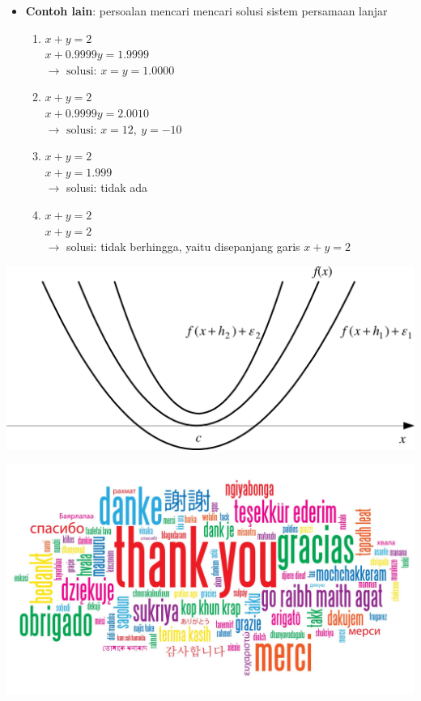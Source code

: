 \documentclass[pdflatex,compress]{beamer}
\begin{document}
\begin{frame}
	\begin{itemize}
		\item \textbf{Contoh lain}: persoalan mencari mencari solusi sistem persamaan lanjar
		\begin{enumerate}
			\item $ x+y=2 $\\
			$ x+0.9999y = 1.9999 $\\
			$ \rightarrow \text{ solusi: } x = y = 1.0000$
			\item $ x+y=2 $\\
			$ x+0.9999y = 2.0010 $\\
			$ \rightarrow \text{ solusi: } x = 12,~y = -10$
			\item $ x+y=2 $\\
			$ x+y = 1.999 $\\
			$ \rightarrow $ solusi: tidak ada			
			\item $ x+y=2 $\\
			$ x+y = 2 $\\
			$ \rightarrow $ solusi: tidak berhingga, yaitu disepanjang garis $ x + y = 2 $
		\end{enumerate}
	\end{itemize}
\end{frame}

\begin{frame}
	\begin{center}
		\includegraphics[width=\linewidth]{img/img107}
	\end{center}
\end{frame}

\begin{frame}
	\begin{center}
		\includegraphics[width=\linewidth]{../../../img/thank_you.jpg}
	\end{center}
\end{frame}
\end{document}
